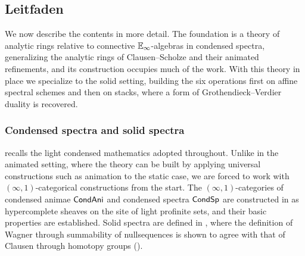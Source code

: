 \subsection{Leitfaden}\label{subsec: intro leitfaden}
We now describe the contents in more detail. The foundation is a theory of analytic rings relative to connective $\mathbb{E}_{\infty}$-algebras in condensed spectra, generalizing the analytic rings of Clausen--Scholze and their animated refinements, and its construction occupies much of the work. With this theory in place we specialize to the solid setting, building the six operations first on affine spectral schemes and then on stacks, where a form of Grothendieck--Verdier duality is recovered.
\subsubsection{Condensed spectra and solid spectra}\label{subsubsec: intro condensed}
 recalls the light condensed mathematics adopted throughout. Unlike in the animated setting, where the theory can be built by applying universal constructions such as animation to the static case, we are forced to work with $(\infty,1)$-categorical constructions from the start. The $(\infty,1)$-categories of condensed animae $\mathsf{Cond}\mathsf{Ani}$ and condensed spectra $\mathsf{Cond}\mathsf{Sp}$ are constructed in  as hypercomplete sheaves on the site of light profinite sets, and their basic properties are established. Solid spectra are defined in , where the definition of Wagner \cite[\S B.6]{WagnerHHab} through summability of nullsequences is shown to agree with that of Clausen \cite[Def. 13.2]{ClausenLie} through homotopy groups ().
